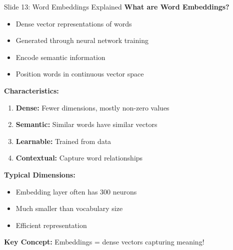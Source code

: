 \documentclass[8pt]{beamer}
\begin{document}
	\begin{frame}{Slide 13: Word Embeddings Explained}
		\fontsize{6.5}{7.5}\selectfont
		\textbf{What are Word Embeddings?}
		\begin{itemize}
			\item Dense vector representations of words
			\item Generated through neural network training
			\item Encode semantic information
			\item Position words in continuous vector space
		\end{itemize}
		
		\vspace{0.1cm}
		\textbf{Characteristics:}
		\begin{enumerate}
			\item \textbf{Dense:} Fewer dimensions, mostly non-zero values
			\item \textbf{Semantic:} Similar words have similar vectors
			\item \textbf{Learnable:} Trained from data
			\item \textbf{Contextual:} Capture word relationships
		\end{enumerate}
		
		\vspace{0.1cm}
		\textbf{Typical Dimensions:}
		\begin{itemize}
			\item Embedding layer often has 300 neurons
			\item Much smaller than vocabulary size
			\item Efficient representation
		\end{itemize}
		
		\textcolor{myblue}{\textbf{Key Concept:}} Embeddings = dense vectors capturing meaning!
	\end{frame}
	
\end{document}
